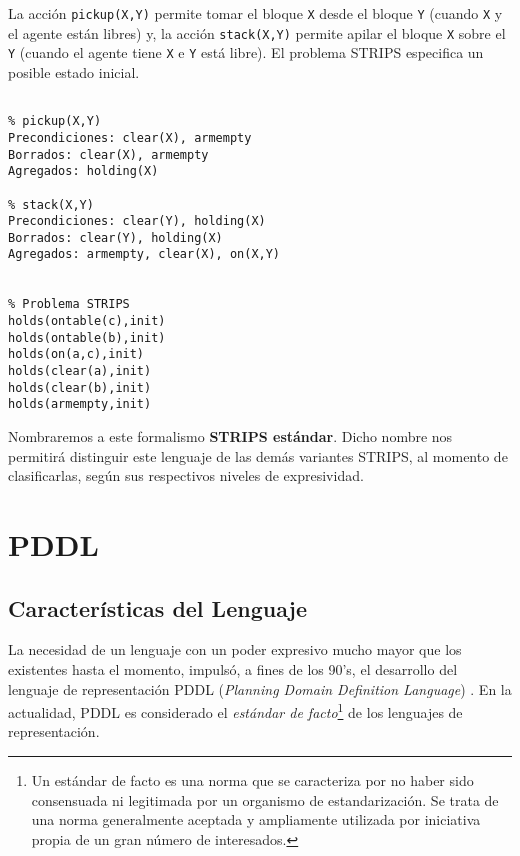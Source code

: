 \begin{ejemplo}\label{cap2:MBSTRIPS}

La acci\'on \texttt{pickup(X,Y)} permite tomar el bloque \texttt{X} 
desde el bloque \texttt{Y} (cuando \texttt{X} y el agente est\'an
libres) y, la acci\'on \texttt{stack(X,Y)} permite apilar el bloque 
\texttt{X} sobre el \texttt{Y} (cuando el agente tiene 
\texttt{X} e \texttt{Y} est\'a libre). El problema STRIPS
especifica un posible estado inicial.

 \begin{verbatim}

% pickup(X,Y)
Precondiciones: clear(X), armempty
Borrados: clear(X), armempty
Agregados: holding(X)

% stack(X,Y)
Precondiciones: clear(Y), holding(X)
Borrados: clear(Y), holding(X)
Agregados: armempty, clear(X), on(X,Y)


% Problema STRIPS
holds(ontable(c),init)
holds(ontable(b),init)
holds(on(a,c),init)
holds(clear(a),init)
holds(clear(b),init)
holds(armempty,init)
 \end{verbatim}
\end{ejemplo}


Nombraremos a este formalismo {\bf STRIPS est\'andar}. Dicho
nombre nos permitir\'a distinguir este lenguaje de las dem\'as variantes STRIPS,
al momento de clasificarlas, seg\'un sus respectivos niveles de expresividad.


\section{PDDL} \label{cap1:PDDL}


\subsection{Caracter\'isticas del Lenguaje}

La necesidad de un lenguaje con un poder expresivo mucho mayor que los existentes 
hasta el momento, impuls\'o, a fines de los 90's, el desarrollo  del lenguaje de 
representaci\'on PDDL (\emph{Planning Domain Definition Language}) \cite{mder:pddl}. 
En la actualidad, PDDL es considerado el \emph{est\'andar de facto}\footnote{Un est\'andar de facto 
es una norma que se caracteriza por no haber sido consensuada ni legitimada 
por un organismo de estandarizaci\'on. Se trata de una norma generalmente aceptada
y ampliamente utilizada por iniciativa propia de un gran n\'umero de interesados.} 
de los lenguajes de representaci\'on. 

